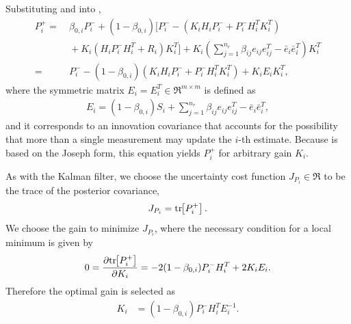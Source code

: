 Substituting  and  into ,%
\begin{align}
P^+_{i}=&\ \beta_{0,i}P^-_{i}+(1-\beta_{0,i})[P^-_i-(K_iH_iP^-_i+P^-_iH_i^TK_i^T)\nonumber
\\
&\ +K_i(H_iP^-_iH_i^T+R_i)K_i^T]+K_i\left({\sum_{j=1}^{n_r} \beta_{ij}e_{ij}e_{ij}^T-{\bar{e}}_{i}}{\bar{e}}_{i}^T\right)K_{i}^T\nonumber
\\
=&\ P^-_{i}-(1-\beta_{0,i})(K_iH_iP^-_i+P^-_iH_i^TK_i^T)+K_iE_iK_i^T,\label{eqn:CovExpanded}
\end{align}
where the symmetric matrix $E_i=E_i^T\in\Re^{m\times m}$ is defined as
\begin{align}
E_i=(1-\beta_{0,i})S_i+{\sum_{j=1}^{n_r} \beta_{ij}e_{ij}e_{ij}^T-{\bar{e}}_{i}}{\bar{e}}_{i}^T,\label{eqn:E}
\end{align}
and it corresponds to an innovation covariance that accounts for the possibility that more than a single measurement may update the $i$-th estimate.
Because  is based on the Joseph form, this equation yields $P^+_{i}$ for arbitrary gain $K_i$.

As with the Kalman filter, we choose the uncertainty cost function $J_{P_i}\in\Re$ to be the trace of the posterior covariance,
\begin{align}
\label{eqn:JpIntro}
J_{P_i}=\mathrm{tr}\negthickspace\left[ P_i^+ \right].
\end{align}
We choose the gain to minimize $J_{P_i}$, where the necessary condition for a local minimum is given by
\begin{align}
0=\frac{\partial\mathrm{tr}\negthickspace\left[ P^+_i \right]}{\partial K_i}=-2(1-\beta_{0,i})P^-_iH_i^T+2K_iE_i.\label{eqn:Uncertainty0}
\end{align}
Therefore the optimal gain is selected as
\begin{align}
K_i&=(1-\beta_{0,i})P^-_iH_i^TE_i^{-1}.\label{eqn:GainK}
\end{align}

